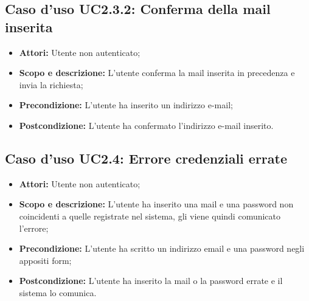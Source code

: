 	\subsection{Caso d'uso UC2.3.2: Conferma della mail inserita}
	\begin{itemize}
		\item \textbf{Attori:} Utente non autenticato;
		\item \textbf{Scopo e descrizione:} L'utente conferma la mail inserita in precedenza e invia la richiesta;
		\item \textbf{Precondizione:} L'utente ha inserito un indirizzo e-mail;
		\item \textbf{Postcondizione:} L'utente ha confermato l'indirizzo e-mail inserito.
	\end{itemize}

\subsection{Caso d'uso UC2.4: Errore credenziali errate}
\begin{itemize}
	\item \textbf{Attori:} Utente non autenticato;
	\item \textbf{Scopo e descrizione:} L'utente ha inserito una mail e una password non coincidenti a quelle registrate nel sistema, gli viene quindi comunicato l'errore;
	\item \textbf{Precondizione:} L'utente ha scritto un indirizzo email e una password negli appositi form;
	\item \textbf{Postcondizione:} L'utente ha inserito la mail o la password errate e il sistema lo comunica.
\end{itemize}